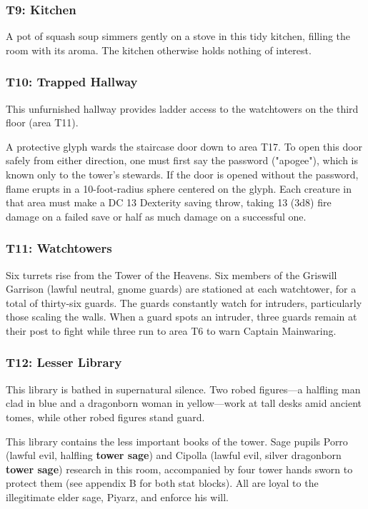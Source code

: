 \documentclass[10pt,a4paper,twoside,bg=print,twocolumn,openany,nodeprecatedcode]{dndbook}
\begin{document}
\subsubsection{T9: Kitchen}
A pot of squash soup simmers gently on a stove in this tidy kitchen, filling the room with its aroma. The kitchen otherwise holds nothing of interest.

\subsubsection{T10: Trapped Hallway}
This unfurnished hallway provides ladder access to the watchtowers on the third floor (area T11).

A protective glyph wards the staircase door down to area T17. To open this door safely from either direction, one must first say the password ("apogee"), which is known only to the tower's stewards. If the door is opened without the password, flame erupts in a 10-foot-radius sphere centered on the glyph. Each creature in that area must make a DC 13 Dexterity saving throw, taking 13 (3d8) fire damage on a failed save or half as much damage on a successful one.

\subsubsection{T11: Watchtowers}
Six turrets rise from the Tower of the Heavens. Six members of the Griswill Garrison (lawful neutral, gnome guards) are stationed at each watchtower, for a total of thirty-six guards. The guards constantly watch for intruders, particularly those scaling the walls. When a guard spots an intruder, three guards remain at their post to fight while three run to area T6 to warn Captain Mainwaring.

\subsubsection{T12: Lesser Library}
\begin{DndReadAloud}{}
This library is bathed in supernatural silence. Two robed figures—a halfling man clad in blue and a dragonborn woman in yellow—work at tall desks amid ancient tomes, while other robed figures stand guard.

\end{DndReadAloud}

This library contains the less important books of the tower. Sage pupils Porro (lawful evil, halfling \textbf{tower sage}) and Cipolla (lawful evil, silver dragonborn \textbf{tower sage}) research in this room, accompanied by four tower hands sworn to protect them (see appendix B for both stat blocks). All are loyal to the illegitimate elder sage, Piyarz, and enforce his will.
\end{document}
